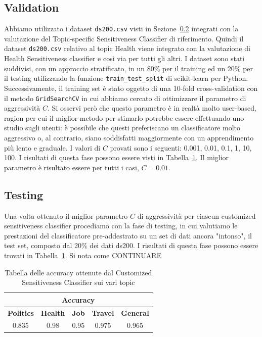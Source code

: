 \subsection{Validation}
Abbiamo utilizzato i dataset {\tt ds200.csv} visti in Sezione~\ref{} integrati con la valutazione del Topic-specific Sensitiveness Classifier di riferimento. Quindi il dataset {\tt ds200.csv} relativo al topic Health viene integrato con la valutazione di Health Sensitiveness classifier e così via per tutti gli altri.
I dataset sono stati suddivisi, con un approccio stratificato, in un 80\% per il training ed un 20\% per il testing utilizzando la funzione {\tt train\_test\_split} di scikit-learn per Python. Successivamente, il training set è stato oggetto di una 10-fold cross-validation con il metodo {\tt GridSearchCV} in cui abbiamo cercato di ottimizzare il parametro di aggressività $C$. Si osservi però che questo parametro è in realtà molto user-based, ragion per cui il miglior metodo per stimarlo potrebbe essere effettuando uno studio sugli utenti: è possibile che questi preferiscano un classificatore molto aggressivo o, al contrario, siano soddisfatti maggiormente con un apprendimento più lento e graduale. I valori di $C$ provati sono i seguenti: 0.001, 0.01, 0.1, 1, 10, 100. I risultati di questa fase possono essere visti in Tabella~\ref{tbl:testing_Customized}. Il miglior parametro è risultato essere per tutti i casi, $C=0.01$.

\subsection{Testing}
Una volta ottenuto il miglior parametro $C$ di aggressività per ciascun customized sensitiveness classifier procediamo con la fase di testing, in cui valutiamo le prestazioni del classificatore pre-addestrato su un set di dati ancora "intonso", il test set, composto dal 20\% dei dati ds200. I risultati di questa fase possono essere trovati in Tabella~\ref{tbl:testing_Customized}. Si nota come CONTINUARE


\begin{table}[h!t]
\centering
\label{tbl:testing_Customized}
\begin{tabular}{|c|c|c|c|c|}
\hline
\multicolumn{5}{|c|}{\textbf{Accuracy}} \\ \hline
\textbf{Politics} & \textbf{Health} & \textbf{Job} & \textbf{Travel} & \textbf{General} \\ \hline
0.835 & 0.98 & 0.95 & 0.975 & 0.965 \\ \hline
\end{tabular}
\caption{Tabella delle accuracy ottenute dal Customized Sensitiveness Classifier sui vari topic}
\end{table}
\FloatBarrier